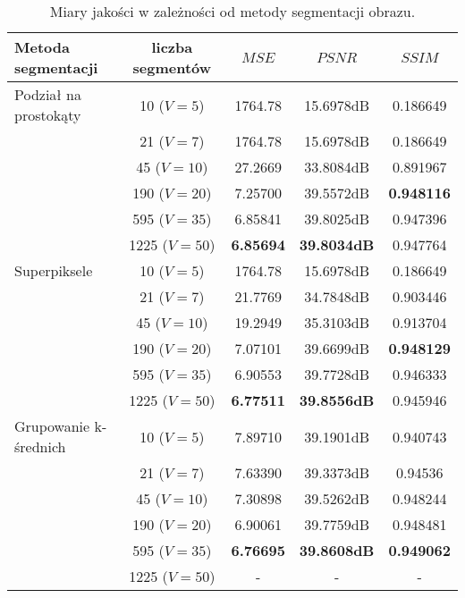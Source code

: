 {{{            \begin{table}
                \centering
                \begin{tabular}{ |l|c|c c c| }
                    \hline
                    Metoda segmentacji & liczba segmentów & $MSE$ & $PSNR$ & $SSIM$ \\
                    \hline
                    Podział na prostokąty & 10   ($V=5$)  & 1764.78 & 15.6978dB & 0.186649 \\
                                        & 21   ($V=7$)  & 1764.78 & 15.6978dB & 0.186649 \\
                                        & 45   ($V=10$) & 27.2669 & 33.8084dB & 0.891967 \\
                                        & 190  ($V=20$) & 7.25700 & 39.5572dB & \textbf{0.948116} \\
                                        & 595  ($V=35$) & 6.85841 & 39.8025dB & 0.947396 \\
                                        & 1225 ($V=50$) & \textbf{6.85694} & \textbf{39.8034dB} & 0.947764 \\
                    \hline
                    Superpiksele          & 10   ($V=5$)  & 1764.78 & 15.6978dB & 0.186649 \\
                                        & 21   ($V=7$)  & 21.7769 & 34.7848dB & 0.903446 \\
                                        & 45   ($V=10$) & 19.2949 & 35.3103dB & 0.913704 \\
                                        & 190  ($V=20$) & 7.07101 & 39.6699dB & \textbf{0.948129} \\
                                        & 595  ($V=35$) & 6.90553 & 39.7728dB & 0.946333 \\
                                        & 1225 ($V=50$) & \textbf{6.77511} & \textbf{39.8556dB} & 0.945946 \\
                    \hline
                    Grupowanie k-średnich & 10   ($V=5$)  & 7.89710 & 39.1901dB & 0.940743 \\
                                        & 21   ($V=7$)  & 7.63390 & 39.3373dB & 0.94536 \\
                                        & 45   ($V=10$) & 7.30898 & 39.5262dB & 0.948244 \\
                                        & 190  ($V=20$) & 6.90061 & 39.7759dB & 0.948481 \\
                                        & 595  ($V=35$) & \textbf{6.76695} & \textbf{39.8608dB} & \textbf{0.949062} \\
                                        & 1225 ($V=50$) & - & - & - \\
                    \hline
                \end{tabular}
                \caption{Miary jakości w zależności od metody segmentacji obrazu.}
                \label{tab:exp-edge-results}
            \end{table}

}}}
